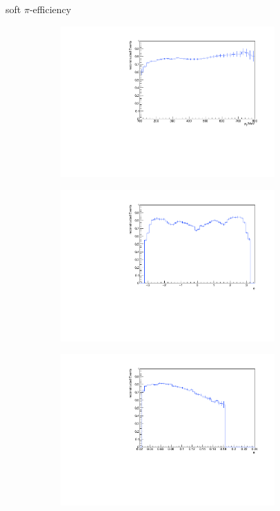 \documentclass[11pt]{beamer}
\begin{document}
\begin{frame}{soft $\pi$-efficiency}
\begin{figure}
\begin{subfigure}{0.45\textwidth}
\includegraphics[width=0.9\textwidth]{up_pdf/single/neg/h_pt_reco_SPi_neg.pdf}
\end{subfigure}
\begin{subfigure}{0.45\textwidth}
\includegraphics[width=0.9\textwidth]{up_pdf/single/neg/h_phi_reco_SPi_neg.pdf}
\end{subfigure}
\begin{subfigure}{0.45\textwidth}
\includegraphics[width=0.9\textwidth]{up_pdf/single/neg/h_theta_reco_SPi_neg.pdf}

\end{subfigure}
\end{figure}
\end{frame}
\end{document}
